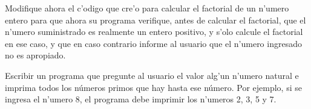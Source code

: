 \documentclass[11pt]{exam}
\begin{document}
\begin{questions}
\item Modifique ahora el c'odigo que cre'o para calcular el factorial de un n'umero entero para que ahora su programa verifique, antes de calcular el factorial, que el n'umero suministrado es realmente un entero positivo, y s'olo calcule el factorial en ese caso, y que en caso contrario informe al usuario que el n'umero ingresado no es apropiado.

\item Escribir un programa que pregunte al usuario el valor alg'un n'umero natural e imprima todos los números primos que hay hasta ese número. Por ejemplo, si se ingresa el n'umero 8, el programa debe imprimir los n'umeros 2, 3, 5 y 7.

\end{questions}
\end{document}
